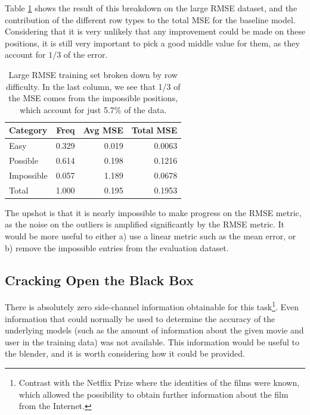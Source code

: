 \documentclass{article}
\begin{document}
Table \ref{table:row-types-rmse} shows the result of this breakdown on the large RMSE dataset, and the contribution of the different row types to the total MSE for the baseline model.  Considering that it is very unlikely that any improvement could be made on these positions, it is still very important to pick a good middle value for them, as they account for $1/3$ of the error. 

\begin{table}[t]
\caption{Large RMSE training set broken down by row difficulty.  In the last column, we see that 1/3 of the MSE comes from the impossible positions, which account for just 5.7\% of the data.}
\label{table:row-types-rmse}
\vskip 0.15in
\begin{center}
\begin{small}
\begin{sc}
\begin{tabular}{lrrr}
\hline
\abovespace\belowspace
Category & Freq & Avg MSE & Total MSE \\
\hline
\abovespace
Easy          & 0.329 & 0.019 & 0.0063 \\
Possible      & 0.614 & 0.198 & 0.1216 \\
Impossible    & 0.057 & 1.189 & 0.0678 \\
\abovespace\belowspace
Total         & 1.000 & 0.195 & 0.1953 \\
\hline
\end{tabular}
\end{sc}
\end{small}
\end{center}
\vskip -0.1in
\end{table}

The upshot is that it is nearly impossible to make progress on the RMSE metric, as the noise on the outliers is amplified significantly by the RMSE metric.  It would be more useful to either a) use a linear metric such as the mean error, or b) remove the impossible entries from the evaluation dataset.


\subsection{Cracking Open the Black Box}

There is absolutely zero side-channel information obtainable for this task\footnote{Contrast with the Netflix Prize where the identities of the films were known, which allowed the possibility to obtain further information about the film from the Internet.}.  Even information that could normally be used to determine the accuracy of the underlying models (such as the amount of information about the given movie and user in the training data) was not available.  This information would be useful to the blender, and it is worth considering how it could be provided.
\end{document}
